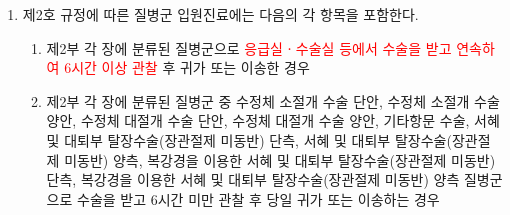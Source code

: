 \begin{myshadowbox}
\begin{enumerate}[3.]\tightlist
\item 제2호 규정에 따른 질병군 입원진료에는 다음의 각 항목을 포함한다.
	\begin{enumerate}[가.]\tightlist
	\item 제2부 각 장에 분류된 질병군으로 \textcolor{red}{응급실ㆍ수술실 등에서 수술을 받고 연속하여 6시간 이상 관찰} 후 귀가 또는 이송한 경우
	\item 제2부 각 장에 분류된 질병군 중 수정체 소절개 수술 단안, 수정체 소절개 수술 양안, 수정체 대절개 수술 단안, 수정체 대절개 수술 양안, 기타항문 수술, 서혜 및 대퇴부 탈장수술(장관절제 미동반) 단측, 서혜 및 대퇴부 탈장수술(장관절제 미동반) 양측, 복강경을 이용한 서혜 및 대퇴부 탈장수술(장관절제 미동반) 단측, 복강경을 이용한 서혜 및 대퇴부 탈장수술(장관절제 미동반) 양측 질병군으로 수술을 받고 6시간 미만 관찰 후 당일 귀가 또는 이송하는 경우
	\end{enumerate}
\end{enumerate}
\end{myshadowbox}
\prezi{\clearpage}		

